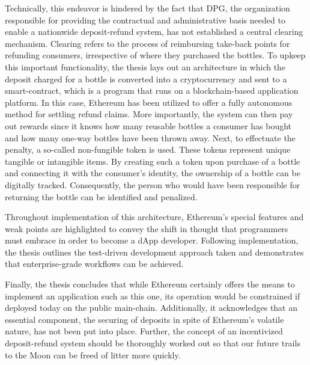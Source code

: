 Technically, this endeavor is hindered by the fact that \acf{DPG}, the organization responsible for providing the contractual and administrative basis needed to enable a nationwide deposit-refund system, has not established a central clearing mechanism. Clearing refers to the process of reimbursing take-back points for refunding consumers, irrespective of where they purchased the bottles. To upkeep this important functionality, the thesis lays out an architecture in which the deposit charged for a bottle is converted into a cryptocurrency and sent to a smart-contract, which is a program that runs on a blockchain-based application platform. In this case, Ethereum has been utilized to offer a fully autonomous method for settling refund claims. More importantly, the system can then pay out rewards since it knows how many reusable bottles a consumer has bought and how many one-way bottles have been thrown away. Next, to effectuate the penalty, a so-called non-fungible token is used. These tokens represent unique tangible or intangible items. By creating such a token upon purchase of a bottle and connecting it with the consumer's identity, the ownership of a bottle can be digitally tracked. Consequently, the person who would have been responsible for returning the bottle can be identified and penalized. 

Throughout implementation of this architecture, Ethereum's special features and weak points are highlighted to convey the shift in thought that programmers must embrace in order to become a \acf{dApp} developer. Following implementation, the thesis outlines the test-driven development approach taken and demonstrates that enterprise-grade workflows can be achieved.

Finally, the thesis concludes that while Ethereum certainly offers the means to implement an application such as this one, its operation would be constrained if deployed today on the public main-chain. Additionally, it acknowledges that an essential component, the securing of deposits in spite of Ethereum's volatile nature, has not been put into place. Further, the concept of an incentivized deposit-refund system should be thoroughly worked out so that our future trails to the Moon can be freed of litter more quickly.
